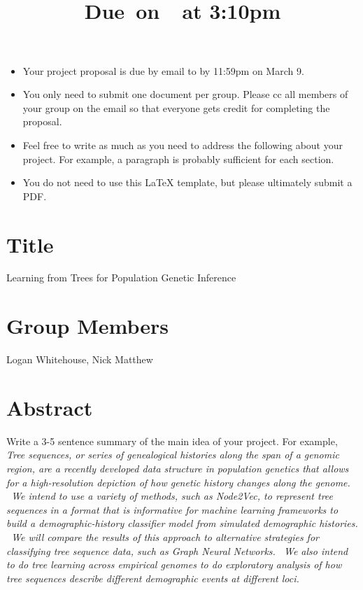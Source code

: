 \documentclass{article}
\title{
    \vspace{2in}
    \textmd{\textbf{\hmwkClass\hmwkTitle}}\\
    \normalsize\vspace{0.1in}\small{Due\ on\ \hmwkDueDate\ at 3:10pm}\\
    \vspace{3in}
}
\author{\hmwkAuthorName}
\date{}
\begin{document}

\begin{itemize}
\item Your project proposal is due by email to  by 11:59pm on March 9. 
\item You only need to submit one document per group. Please cc all members of your group on the email so that everyone gets credit for completing the proposal.  
\item Feel free to write as much as you need to address the following about your project. For example, a paragraph is probably sufficient for each section. 
\item You do not need to use this LaTeX template, but please ultimately submit a PDF. 
\end{itemize}

\section{Title}

Learning from Trees for Population Genetic Inference

\section{Group Members}

Logan Whitehouse, Nick Matthew

\section{Abstract}

Write a 3-5 sentence summary of the main idea of your project. For example, \\

\emph{Tree sequences, or series of genealogical histories along the span of a genomic region, are a recently developed data structure in population genetics that allows for a high-resolution depiction of how genetic history changes along the genome. \
We intend to use a variety of methods, such as Node2Vec, to represent tree sequences in a format that is informative for machine learning frameworks to build a demographic-history classifier model from simulated demographic histories. \
We will compare the results of this approach to alternative strategies for classifying tree sequence data, such as Graph Neural Networks. \
We also intend to do tree learning across empirical genomes to do exploratory analysis of how tree sequences describe different demographic events at different loci.}
\end{document}

